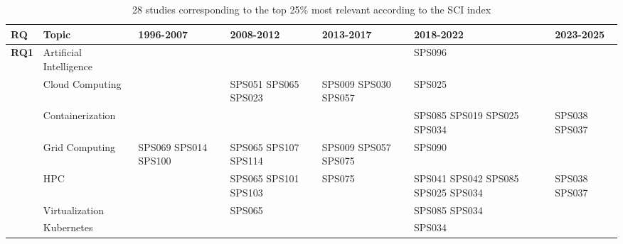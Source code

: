 \begin{table*}[htbp]
	\centering
	\caption{28 studies corresponding to the top 25\% most relevant according to the SCI index}
	\label{table:highest_SCI}
	\renewcommand{\arraystretch}{1.2}
	\setlength{\tabcolsep}{6pt}
	\begin{tabularx}{\textwidth}{p{0.8cm}p{2.5cm}>{\raggedright\arraybackslash}X>{\raggedright\arraybackslash}X>{\raggedright\arraybackslash}X>{\raggedright\arraybackslash}X>{\raggedright\arraybackslash}X}
		\toprule
		\textbf{RQ}                          & \textbf{Topic}          & \textbf{1996-2007}   & \textbf{2008-2012}   & \textbf{2013-2017}   & \textbf{2018-2022}                 & \textbf{2023-2025} \\
		\midrule
		\multirow{12}{*}[0em]{\textbf{RQ1}}  & Artificial Intelligence &                      &                      &                      & SPS096                             &                    \\
		\addlinespace[0.3em]
		                                     & Cloud Computing         &                      & SPS051 SPS065 SPS023 & SPS009 SPS030 SPS057 & SPS025                             &                    \\
		\addlinespace[0.3em]
		                                     & Containerization        &                      &                      &                      & SPS085 SPS019 SPS025 SPS034        & SPS038 SPS037      \\
		\addlinespace[0.3em]
		                                     & Grid Computing          & SPS069 SPS014 SPS100 & SPS065 SPS107 SPS114 & SPS009 SPS057 SPS075 & SPS090                             &                    \\
		\addlinespace[0.3em]
		                                     & HPC                     &                      & SPS065 SPS101 SPS103 & SPS075               & SPS041 SPS042 SPS085 SPS025 SPS034 & SPS038 SPS037      \\
		\addlinespace[0.3em]
		                                     & Virtualization          &                      & SPS065               &                      & SPS085 SPS034                      &                    \\
		\addlinespace[0.3em]
		                                     & Kubernetes              &                      &                      &                      & SPS034                             &                    \\

\end{tabularx}
\end{table*}
